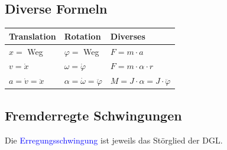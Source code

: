 \begin{tabular}{|p{4cm}|p{8cm}|p{6cm}|}
\begin{minipage}[]{6cm}
    \end{minipage}\\
	\hline	
\end{tabular}

\subsection{Diverse Formeln}
\begin{tabular}{|l|l||l|}
	\hline
	\textbf{Translation}	& \textbf{Rotation} & \textbf{Diverses}\\
	\hline
	\hline
	$x=$ Weg & $\varphi=$ Weg& 
	$F=m\cdot a$\\
	\hline
	$v=\dot{x}$ & $\omega=\dot{\varphi}$&
	$F=m\cdot\alpha\cdot r$\\
	\hline
	$a=\dot{v}=\ddot{x}$ & $\alpha=\dot{\omega}=\ddot{\varphi}$&
	$M=J\cdot\alpha=J\cdot\ddot{\varphi}$\\
	\hline
\end{tabular}

\newpage

\subsection{Fremderregte Schwingungen  }
Die \textcolor{blue}{Erregungsschwingung} ist jeweils das Störglied der DGL.\\

